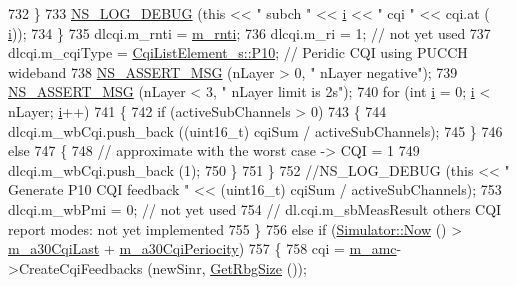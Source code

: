 \begin{DoxyCode}
732             \}
733           \hyperlink{group__logging_ga413f1886406d49f59a6a0a89b77b4d0a}{NS\_LOG\_DEBUG} (\textcolor{keyword}{this} << \textcolor{stringliteral}{" subch "} << \hyperlink{bernuolliDistribution_8m_a6f6ccfcf58b31cb6412107d9d5281426}{i} << \textcolor{stringliteral}{" cqi "} <<  cqi.at (
      \hyperlink{bernuolliDistribution_8m_a6f6ccfcf58b31cb6412107d9d5281426}{i}));
734         \}
735       dlcqi.m\_rnti = \hyperlink{classns3_1_1LteUePhy_a887b5dc4e246a308cd09127b64ed8fac}{m\_rnti};
736       dlcqi.m\_ri = 1; \textcolor{comment}{// not yet used}
737       dlcqi.m\_cqiType = \hyperlink{structns3_1_1CqiListElement__s_a8f1bd827fd9842e7c07e39265d88299aa9db5a80433fbf06a4c98935e28ad26e8}{CqiListElement\_s::P10}; \textcolor{comment}{// Peridic CQI using PUCCH wideband}
738       \hyperlink{assert_8h_aff5ece9066c74e681e74999856f08539}{NS\_ASSERT\_MSG} (nLayer > 0, \textcolor{stringliteral}{" nLayer negative"});
739       \hyperlink{assert_8h_aff5ece9066c74e681e74999856f08539}{NS\_ASSERT\_MSG} (nLayer < 3, \textcolor{stringliteral}{" nLayer limit is 2s"});
740       \textcolor{keywordflow}{for} (\textcolor{keywordtype}{int} \hyperlink{bernuolliDistribution_8m_a6f6ccfcf58b31cb6412107d9d5281426}{i} = 0; \hyperlink{bernuolliDistribution_8m_a6f6ccfcf58b31cb6412107d9d5281426}{i} < nLayer; \hyperlink{bernuolliDistribution_8m_a6f6ccfcf58b31cb6412107d9d5281426}{i}++)
741         \{
742           \textcolor{keywordflow}{if} (activeSubChannels > 0)
743             \{
744               dlcqi.m\_wbCqi.push\_back ((uint16\_t) cqiSum / activeSubChannels);
745             \}
746           \textcolor{keywordflow}{else}
747             \{
748               \textcolor{comment}{// approximate with the worst case -> CQI = 1}
749               dlcqi.m\_wbCqi.push\_back (1);
750             \}
751         \}
752       \textcolor{comment}{//NS\_LOG\_DEBUG (this << " Generate P10 CQI feedback " << (uint16\_t) cqiSum / activeSubChannels);}
753       dlcqi.m\_wbPmi = 0; \textcolor{comment}{// not yet used}
754       \textcolor{comment}{// dl.cqi.m\_sbMeasResult others CQI report modes: not yet implemented}
755     \}
756   \textcolor{keywordflow}{else} \textcolor{keywordflow}{if} (\hyperlink{classns3_1_1Simulator_ac3178fa975b419f7875e7105be122800}{Simulator::Now} () > \hyperlink{classns3_1_1LteUePhy_a912b9e3767497522b16d68e3602ec0a3}{m\_a30CqiLast} + 
      \hyperlink{classns3_1_1LteUePhy_a154d2c8025b353d563bf4ed40045536f}{m\_a30CqiPeriocity})
757     \{
758       cqi = \hyperlink{classns3_1_1LteUePhy_ac41d7c77006896a6e9573867fc60f268}{m\_amc}->CreateCqiFeedbacks (newSinr, \hyperlink{classns3_1_1LtePhy_a0b43cc13670b730fce0b55c8e0db60d9}{GetRbgSize} ());

\end{DoxyCode}
